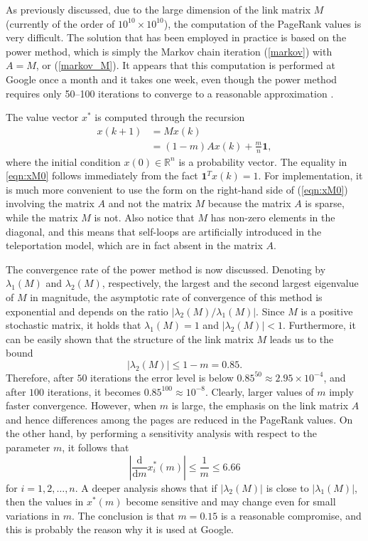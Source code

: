 \documentclass[11pt,draftcls,onecolumn]{IEEEtran}
\newcommand{\field}[1]{{\mathbb{#1}}}
\newcommand{\one}{\mathbf{1}}
\newcommand{\R}{\field{R}}
\begin{document}
\vspace{.5cm}

As previously discussed, due to the large dimension of the link matrix $M$ (currently of 
the order of $10^{10} \times 10^{10}$), the computation of the PageRank values is very difficult. 
The solution that has been employed in practice 
is based on the power method, which is simply the Markov chain iteration (\ref{markov}) with $A=M$,
or (\ref{markov_M}).
It appears that this computation is performed at Google once a month and it takes one week, 
even though the power method requires only 50--100 iterations
to converge to a reasonable approximation \cite{LanMey:06}.  

The value vector $x^*$ is computed through the recursion 
\begin{align}
x(k+1) 
  &= M x(k) \nonumber\\
  &= (1-m)A x(k) + \frac{m}{n}\one,
    \label{eqn:xM0} 
\end{align}
where the initial condition $x(0)\in \R^n$ is a probability vector.  
The equality in \eqref{eqn:xM0} follows immediately from the fact 
$\one^Tx(k)=1$.
For implementation, it is much more convenient to use the form 
on the right-hand side of 
(\ref{eqn:xM0}) involving the matrix $A$ and not the matrix $M$ because the matrix 
$A$ is sparse, while the matrix $M$ is not. Also notice that $M$ has non-zero elements 
in the diagonal, and this means that self-loops are artificially introduced in 
the teleportation model, which are in fact absent in the matrix $A$.

The convergence rate of the power method is now discussed.
Denoting by $\lambda_1(M)$ and $\lambda_2(M)$, respectively,  
the largest and the second largest eigenvalue of $M$ 
in magnitude, the asymptotic rate of convergence of this method is exponential and
depends on the ratio $|\lambda_2(M)/\lambda_1(M)|$.
Since $M$ is a positive stochastic matrix, 
it holds that $\lambda_1(M)=1$ and $|\lambda_2(M)|<1$.
Furthermore, it can be easily shown that 
the structure of the link matrix $M$ leads us to the bound 
\begin{equation*}
|\lambda_2(M)| \leq 1-m = 0.85.
\end{equation*}
Therefore, after $50$ iterations the error level is below 
$0.85^{50} \approx 2.95\times 10^{-4}$, and 
after $100$ iterations, it becomes $0.85^{100} \approx 10^{-8}$.
Clearly, larger values of $m$ imply faster convergence. 
However, when $m$ is large, the emphasis on the link matrix $A$ 
and hence differences among the pages are reduced in the PageRank values. 
On the other hand, 
by performing a sensitivity analysis with respect to the parameter $m$, 
it follows that
$$
\left|\frac{{\mathrm d}}{{\mathrm d} m} x_i^*(m)\right| \le \frac{1}{m} \le 6.66
$$
for $i=1,2, \ldots,n$. A deeper analysis \cite{LanMey:06} shows that if $|\lambda_2(M)|$ 
is close to $|\lambda_1(M)|$, then 
the values in $x^*(m)$ become sensitive and may change even for small 
variations in $m$.
The conclusion is that $m=0.15$ is a reasonable compromise, 
and this is probably the reason why it is used at Google.
\end{document}
